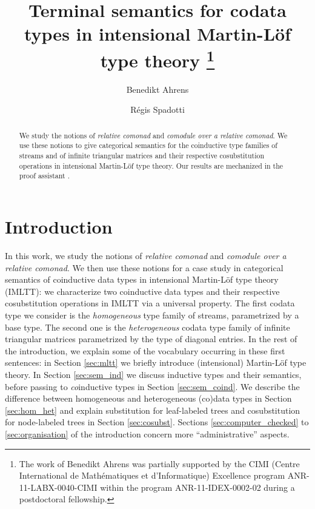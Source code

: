 \documentclass[a4paper,USenglish]{lipics}
\title{Terminal semantics for codata types in intensional Martin-L\"of type theory%
\footnote{The work of Benedikt Ahrens was partially supported by the CIMI (Centre International de Mathématiques et d'Informatique) Excellence program ANR-11-LABX-0040-CIMI within the program ANR-11-IDEX-0002-02 during a postdoctoral fellowship.}
}
\author{Benedikt Ahrens}
\author{R\'egis Spadotti}
\affil{
Institut de Recherche en Informatique de Toulouse\\
Universit\'e Paul Sabatier, 
Toulouse}
\begin{document}
\maketitle


\begin{abstract}
 We study the notions of \emph{relative comonad} and \emph{comodule over a relative comonad}.
 We use these notions to give categorical semantics for the coinductive type families of streams and
 of infinite triangular matrices and their respective cosubstitution operations in intensional Martin-L\"of type theory.
 Our results are mechanized in the proof assistant \coq.
\end{abstract}




\section{Introduction}
 
 In this work, we study the notions of \emph{relative comonad} and \emph{comodule over a relative comonad}.
 We then use these notions for a case study in categorical semantics of coinductive data types in intensional Martin-Löf type theory (IMLTT): 
 we characterize two coinductive data types and their respective cosubstitution operations 
 in IMLTT via a universal property.
 The first codata type we consider is the \emph{homogeneous} type family of streams, parametrized by a base type.
 The second one is the \emph{heterogeneous} codata type family of infinite triangular matrices parametrized by the type of diagonal entries.
  In the rest of the introduction, we explain some of the vocabulary occurring in these first sentences:
  in Section \ref{sec:mltt} we briefly introduce (intensional) Martin-Löf type theory. In Section \ref{sec:sem_ind} we discuss inductive types and their semantics,
  before passing to \emph{co}inductive types in Section \ref{sec:sem_coind}.
  We describe
  the difference between homogeneous and heterogeneous (co)data types in Section \ref{sec:hom_het} and explain substitution for leaf-labeled trees and cosubstitution for node-labeled trees in Section \ref{sec:cosubst}.
  Sections \ref{sec:computer_checked} to \ref{sec:organisation} of the introduction concern more \enquote{administrative} aspects.
  
  
\end{document}
